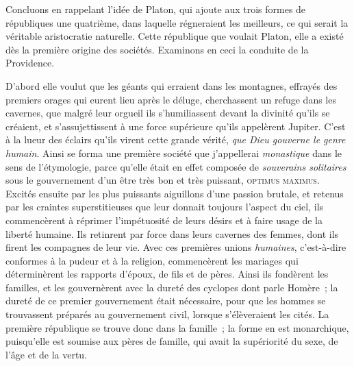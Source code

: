 \documentclass[french,twoside]{book} %
\newcommand\chaptercont{} %
\begin{document}
\chaptercont
\noindent  Concluons en rappelant l’idée de Platon, qui ajoute aux trois formes de républiques une quatrième, dans laquelle régneraient les meilleurs, ce qui serait la véritable aristocratie naturelle. Cette république que voulait Platon, elle a existé dès la première origine des sociétés. Examinons en ceci la conduite de la Providence.\par
D’abord elle voulut que les géants qui erraient dans les montagnes, effrayés des premiers orages qui eurent lieu après le déluge, cherchassent un refuge dans les cavernes, que malgré leur orgueil ils s’humiliassent devant la divinité qu’ils se créaient, et s’assujettissent à une force supérieure qu’ils appelèrent Jupiter. C’est à la lueur des éclairs qu’ils virent cette grande vérité, {\itshape que Dieu gouverne le genre humain}. Ainsi se forma une première société que j’appellerai {\itshape monastique} dans le sens de l’étymologie, parce qu’elle était en effet composée de  {\itshape souverains solitaires} sous le gouvernement d’un être très bon et très puissant, {\scshape optimus maximus}. Excités ensuite par les plus puissants aiguillons d’une passion brutale, et retenus par les craintes superstitieuses que leur donnait toujours l’aspect du ciel, ils commencèrent à réprimer l’impétuosité de leurs désirs et à faire usage de la liberté humaine. Ils retinrent par force dans leurs cavernes des femmes, dont ils firent les compagnes de leur vie. Avec ces premières unions {\itshape humaines}, c’est-à-dire conformes à la pudeur et à la religion, commencèrent les mariages qui déterminèrent les rapports d’époux, de fils et de pères. Ainsi ils fondèrent les familles, et les gouvernèrent avec la dureté des cyclopes dont parle Homère ; la dureté de ce premier gouvernement était nécessaire, pour que les hommes se trouvassent préparés au gouvernement civil, lorsque s’élèveraient les cités. La première république se trouve donc dans la famille ; la forme en est monarchique, puisqu’elle est soumise aux pères de famille, qui avait la supériorité du sexe, de l’âge et de la vertu.\par
\end{document}
